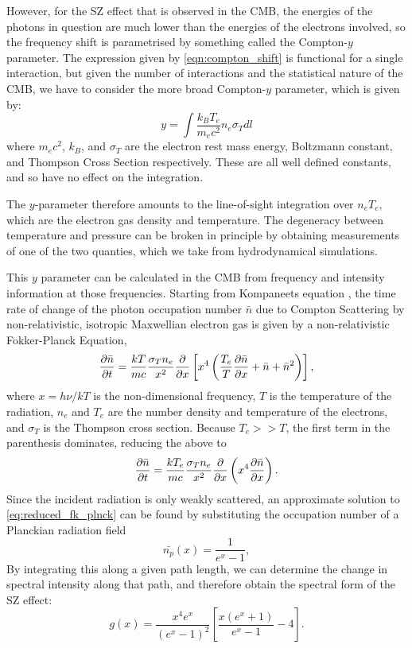 However, for the SZ effect that is observed in the CMB, the energies of the photons in question are much lower than the energies of the electrons involved, so the frequency shift is parametrised by something called the Compton-$y$ parameter. The expression given by \eqref{eqn:compton_shift} is functional for a single interaction, but given the number of interactions and the statistical nature of the CMB, we have to consider the more broad Compton-$y$ parameter, which is given by:
\begin{equation}
y = \int \frac{k_B T_e}{m_e c^2} n_e \sigma_T d \mathit{l}
\label{eqn:y_param}
\end{equation}
where $m_e c^2$, $k_B$, and $\sigma_T$ are the electron rest mass energy, Boltzmann constant, and Thompson Cross Section respectively. These are all well defined constants, and so have no effect on the integration. 

\par The $y$-parameter therefore amounts to the line-of-sight integration over $n_e T_e$, which are the electron gas density and temperature. The degeneracy between temperature and pressure can be broken in principle by obtaining measurements of one of the two quanties, which we take from hydrodynamical simulations.

This $y$ parameter can be calculated in the CMB from frequency and intensity information at those frequencies. Starting from Kompaneets equation \citep{1957JETP....4..730K}, the time rate of change of the photon occupation number $\bar{n}$ due to Compton Scattering by non-relativistic, isotropic Maxwellian electron gas is given by a non-relativistic Fokker-Planck Equation, \citep{1995ARA&A..33..541R}
\begin{equation}
\pdv{\bar{n}}{t} = \frac{kT}{mc} \frac{\sigma_T n_e}{x^2} \pdv{x} \left[ x^4 \left( \frac{T_e}{T} \pdv{\bar{n}}{x} + \bar{n} + \bar{n}^2 \right) \right],
\label{eq:fk_plnck}
\end{equation}
where $x = h \nu / k T$ is the non-dimensional frequency, $T$ is the temperature of the radiation, $n_e$ and $T_e$ are the number density and temperature of the electrons, and $\sigma_T$ is the Thompson cross section. Because $T_e >> T$, the first term in the parenthesis dominates, reducing the above to 
\begin{equation}
\pdv{\bar{n} }{t} = \frac{k T_e}{m c} \frac{\sigma_T n_e}{x^2} \pdv{x} \left(x^4 \pdv{\bar{n}}{x} \right).
\label{eq:reduced_fk_plnck}
\end{equation}
Since the incident radiation is only weakly scattered, an approximate solution to \ref{eq:reduced_fk_plnck} can be found by substituting the occupation number of a Planckian radiation field
\begin{equation}
\bar{n_p}(x) = \frac{1}{e^x - 1},
\label{eq:plnk_occupation_no}
\end{equation}
By integrating this along a given path length, we can determine the change in spectral intensity along that path, and therefore obtain the spectral form of the SZ effect:
\begin{equation}
g(x) = \frac{x^4 e^x}{(e^x-1)^2} \left[ \frac{x (e^x+1)}{e^x -1 } - 4 \right].
\label{eq:spec_form_y}
\end{equation}

